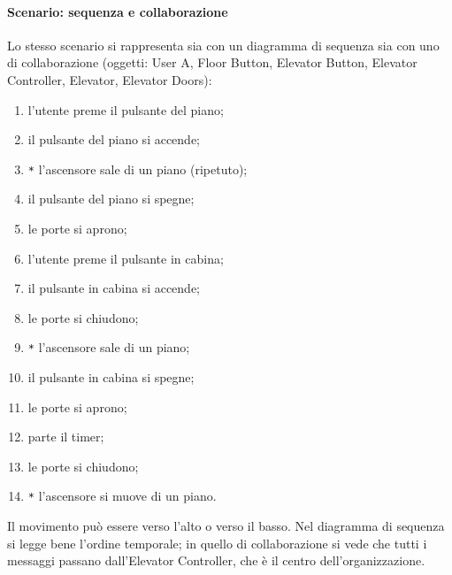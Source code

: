 \documentclass[a4paper,12pt]{article}
\begin{document}
\paragraph{Scenario: sequenza e collaborazione}
Lo stesso scenario si rappresenta sia con un diagramma di sequenza sia con uno di
collaborazione (oggetti: \textsf{User A}, \textsf{Floor Button}, \textsf{Elevator
Button}, \textsf{Elevator Controller}, \textsf{Elevator}, \textsf{Elevator Doors}):
\begin{enumerate}
  \item l'utente preme il pulsante del piano;
  \item il pulsante del piano si accende;
  \item \texttt{*} l'ascensore sale di un piano (ripetuto);
  \item il pulsante del piano si spegne;
  \item le porte si aprono;
  \item l'utente preme il pulsante in cabina;
  \item il pulsante in cabina si accende;
  \item le porte si chiudono;
  \item \texttt{*} l'ascensore sale di un piano;
  \item il pulsante in cabina si spegne;
  \item le porte si aprono;
  \item parte il timer;
  \item le porte si chiudono;
  \item \texttt{*} l'ascensore si muove di un piano.
\end{enumerate}
Il movimento può essere verso l'alto o verso il basso. Nel diagramma di sequenza si legge
bene l'ordine temporale; in quello di collaborazione si vede che tutti i messaggi passano
dall'\textsf{Elevator Controller}, che è il centro dell'organizzazione.
\end{document}
